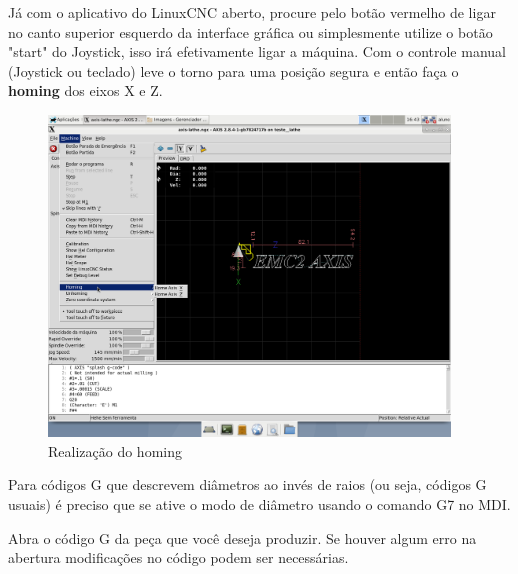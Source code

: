 \documentclass[twoside,a4paper]{refart}
\begin{document}
Já com o aplicativo do LinuxCNC aberto, procure pelo botão vermelho de ligar no canto superior esquerdo da interface gráfica ou simplesmente utilize o botão "start" do Joystick, isso irá efetivamente ligar a máquina. 
Com o controle manual (Joystick ou teclado) leve o torno para uma posição segura e então faça o \textbf{homing} dos eixos X e Z.

\begin{figure}[H]
    \begin{center}
        \includegraphics[width=0.95\textwidth]{imagens/referenciamento_linux_CNC.png}
    \end{center}
    \caption{Realização do homing}\label{homing}
\end{figure}


Para códigos G que descrevem diâmetros ao invés de raios (ou seja, códigos G usuais) é preciso que se ative o modo de diâmetro usando o comando G7 no MDI.

    Abra o código G da peça que você deseja produzir. Se houver algum erro na abertura modificações no código podem ser necessárias.
\end{document}
